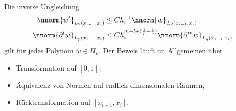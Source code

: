   Die inverse Ungleichung
  \begin{align*}
    \nnorm{w'}_{L_{2}(x_{i-1}, x_{i})} &\leq  C h_{i}^{-1} \nnorm{w}_{L_{2}(x_{i-1}, x_{i})}\\
    \nnorm{\partial^{l} w}_{L_{p}(x_{i-1}, x_{i})} &\leq  C h_{i}^{m - l + (\frac 1 p - \frac 1 q)} \nnorm{\partial^{m} w}_{L_{q}(x_{i-1}, x_{i})}\\
  \end{align*}
  gilt für jedes Polynom $w \in \Pi_{k}$. Der Beweis läuft im Allgemeinen über
  \begin{itemize}
  \item Transformation auf $[0, 1]$, 
  \item Äquivalenz von Normen auf endlich-dimensionalen Räumen, 
  \item Rücktransformation auf $[x_{i-1}, x_{i}]$. 
  \end{itemize}

